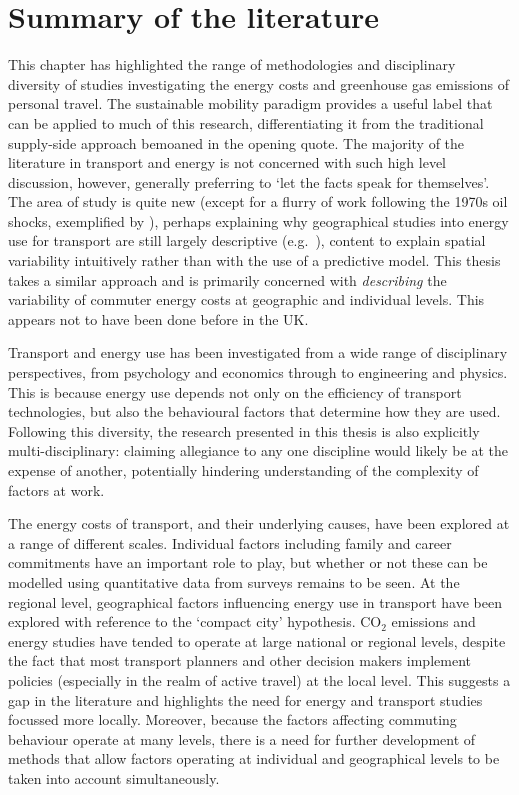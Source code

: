 \documentclass[a4paper, 11pt, twoside]{Thesis}
\begin{document}
\section{Summary of the literature} \label{sc2sum}
This chapter has highlighted the range of methodologies and disciplinary
diversity of studies investigating the energy costs and
greenhouse gas emissions of personal travel.
The sustainable mobility paradigm provides a useful label that can be applied to
much of this research, differentiating it from the traditional supply-side
approach bemoaned in the opening quote. The majority of the literature in
transport and energy is not concerned with such high level discussion, however,
generally preferring to `let the facts speak for themselves'. The area of
study is quite new (except for a flurry of work following the
1970s oil shocks, exemplified by \citet{Fels1975}), perhaps explaining why
geographical studies into energy use for transport are still
largely descriptive (e.g.~\citealp{Marique2013, Boussauw2009}), content to
explain spatial variability intuitively rather than with the use of a
predictive model. This thesis takes a similar approach and is primarily
concerned with \emph{describing} the variability of commuter energy costs
at geographic and individual levels. This appears not to have been done
before in the UK.

Transport and energy use has been investigated from a wide range of disciplinary
perspectives, from psychology and economics through to engineering and physics.
This is because energy use depends not only on the efficiency of transport
technologies, but also the behavioural factors that determine how they are used.
Following this diversity, the research presented in this thesis is also
explicitly multi-disciplinary: claiming allegiance to any one discipline
would likely be at the expense of another, potentially 
hindering understanding of the complexity of factors at work.

The energy costs of transport, and their underlying causes, have been explored at a
range of different scales. Individual factors including family
and career commitments have an important role to play, but whether or not
these can be modelled using quantitative data from surveys remains to be seen.
At the regional level, geographical factors influencing energy use in transport
have been explored with reference to the `compact city' hypothesis. CO$_2$
emissions and energy studies have tended to operate at large national or
regional levels, despite the fact that most transport planners and other decision
makers implement policies (especially in the realm of active travel) at the
local level. This suggests a gap in the literature and highlights the need
for energy and transport studies focussed more locally. Moreover,
because the factors affecting commuting behaviour operate at many levels,
there is a need for further development of methods that allow factors operating
at individual and geographical levels to be taken into account simultaneously.
\end{document}
